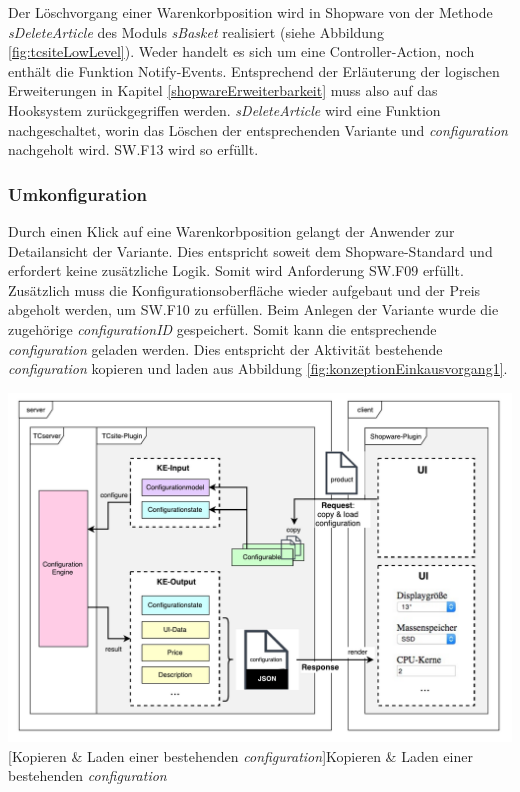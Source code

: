 \documentclass[11pt, a4paper, titlepage, listof=totoc, bibliography=totoc, index=totoc, twoside, openright, headings=normal]{scrreprt}
\begin{document}
Der Löschvorgang einer Warenkorbposition wird in Shopware von der Methode \emph{sDeleteArticle} des Moduls \emph{sBasket} realisiert (siehe Abbildung \ref{fig:tcsiteLowLevel}). Weder handelt es sich um eine Controller-Action, noch enthält die Funktion Notify-Events. Entsprechend der Erläuterung der logischen Erweiterungen in Kapitel \ref{shopwareErweiterbarkeit} muss also auf das Hooksystem zurückgegriffen werden. \emph{sDeleteArticle} wird eine Funktion nachgeschaltet, worin das Löschen der entsprechenden Variante und \emph{configuration} nachgeholt wird. SW.F13 wird so erfüllt.

\subsubsection*{Umkonfiguration}
Durch einen Klick auf eine Warenkorbposition gelangt der Anwender zur Detailansicht der Variante. Dies entspricht soweit dem Shopware-Standard und erfordert keine zusätzliche Logik. Somit wird Anforderung SW.F09 erfüllt. Zusätzlich muss die Konfigurationsoberfläche wieder aufgebaut und der Preis abgeholt werden, um SW.F10 zu erfüllen. Beim Anlegen der Variante wurde die zugehörige \emph{configurationID} gespeichert. Somit kann die entsprechende \emph{configuration} geladen werden. Dies entspricht der Aktivität \glqq bestehende \emph{configuration} kopieren und laden\grqq{} aus Abbildung \ref{fig:konzeptionEinkausvorgang1}.

\vspace{1em}
\begin{minipage}{\linewidth}
	\centering
	\includegraphics[width=1\linewidth]{Abbildungen/konzeptCopy.pdf}
	[Kopieren \& Laden einer bestehenden \emph{configuration}]{Kopieren \& Laden einer bestehenden \emph{configuration}}
	\label{fig:konzeptCopy}
\end{minipage}
\vspace{0.3em}
\end{document}
